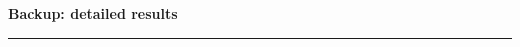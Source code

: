 
\begin{frame}
\centering
\vfill
{\color{uaibluedark}\Large\bfseries Backup: detailed results}\\[6pt]
{\color{uaiorange}\rule{0.3\textwidth}{1pt}}
\vfill
\end{frame}



